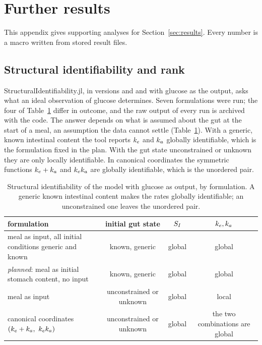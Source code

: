 \section{Further results}
\label{app:results}

This appendix gives supporting analyses for Section~\ref{sec:results}. Every number is a macro written from stored result
files.

\subsection{Structural identifiability and rank}
\label{apx:structural}\label{app:structural}

StructuralIdentifiability.jl, in versions \texttt{\juliaversion} and \texttt{\siversion} and with glucose as the output, asks
what an ideal observation of glucose determines. Seven formulations were run; the four of Table~\ref{tab:structural} differ in
outcome, and the raw output of every run is archived with the code. The
answer depends on what is assumed about the gut at the start of a meal, an assumption the data cannot settle
(Table~\ref{tab:structural}). With a generic, known intestinal content the tool reports $k_e$ and $k_a$ globally
identifiable, which is the formulation fixed in the plan. With the gut state unconstrained or unknown they are only
locally identifiable. In canonical coordinates the symmetric functions $k_e+k_a$ and $k_ek_a$ are globally
identifiable, which is the unordered pair.

\begin{table}[tbp]
\centering\footnotesize
\begin{tabularx}{\linewidth}{Xccc}
\toprule
formulation & initial gut state & $S_I$ & $k_e,k_a$ \\
\midrule
meal as input, all initial conditions generic and known & known, generic & global & global \\
\emph{planned}: meal as initial stomach content, no input & known, generic & global & global \\
meal as input & unconstrained or unknown & global & local \\
canonical coordinates $(k_e+k_a,\ k_ek_a)$ & unconstrained or unknown & global & the two combinations are global \\
\bottomrule
\end{tabularx}
\caption{Structural identifiability of the model with glucose as output, by formulation. A generic known
intestinal content makes the rates globally identifiable; an unconstrained one leaves the unordered pair.}
\label{tab:structural}
\end{table}

